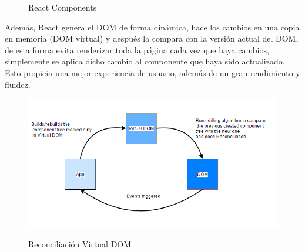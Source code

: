 \documentclass[12pt,twoside,titlepage]{report}
\begin{document}
\begin{figure}[H]
    \centering
    \caption{React Components}
    \label{f:ReactComponents}
   \end{figure}

Además, React genera el DOM de forma dinámica, hace los cambios en una copia en memoria (DOM virtual) y después la compara con la versión actual del DOM, de esta forma evita renderizar toda la página cada vez que haya cambios, simplemente se aplica dicho cambio al componente que haya sido actualizado. Esto propicia una mejor experiencia de usuario, además de un gran rendimiento y fluidez.

\begin{figure}[H]
    \centering
    \includegraphics[scale=0.5]{Reactjs/VirtualDOM1}
    \label{fig:React_VirtualDom}
    \caption{Reconciliación Virtual DOM}
\end{figure}
\end{document}
